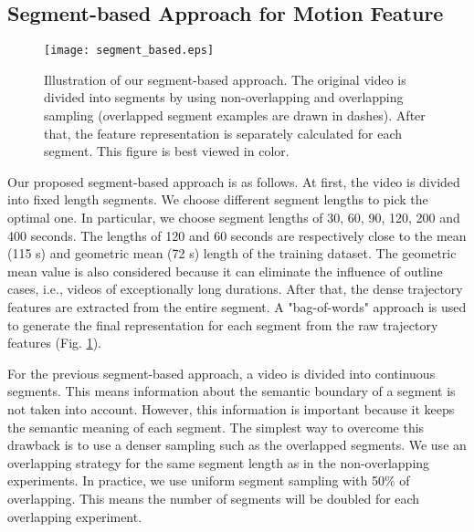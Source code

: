 \subsection{Segment-based Approach for Motion Feature}
\label{subsec:4}
\begin{figure}
	\centering
	\texttt{[image: segment\_based.eps]}
	\caption{Illustration of our segment-based approach. The original video is divided into segments by using non-overlapping and overlapping sampling (overlapped segment examples are drawn in dashes). After that, the feature representation is separately calculated for each segment. This figure is best viewed in color.}
	\label{segmentbased}
\end{figure}

Our proposed segment-based approach is as follows. At first, the video is divided into fixed length segments. We choose different segment lengths to pick the optimal one. In particular, we choose segment lengths of 30, 60, 90, 120, 200 and 400 seconds. The lengths of 120 and 60 seconds are respectively close to the mean (115 s) and geometric mean (72 s) length of the training dataset. The geometric mean value is also considered because it can eliminate the influence of outline cases, i.e., videos of exceptionally long durations. After that, the dense trajectory features are extracted from the entire segment. A "bag-of-words" approach is used to generate the final representation for each segment from the raw trajectory features (Fig. \ref{segmentbased}).

For the previous segment-based approach, a video is divided into continuous segments. This means information about the semantic boundary of a segment is not taken into account. However, this information is important because it keeps the semantic meaning of each segment. The simplest way to overcome this drawback is to use a denser sampling such as the overlapped segments. We use an overlapping strategy for the same segment length as in the non-overlapping experiments. In practice, we use uniform segment sampling with 50\% of overlapping. This means the number of segments will be doubled for each overlapping experiment.


